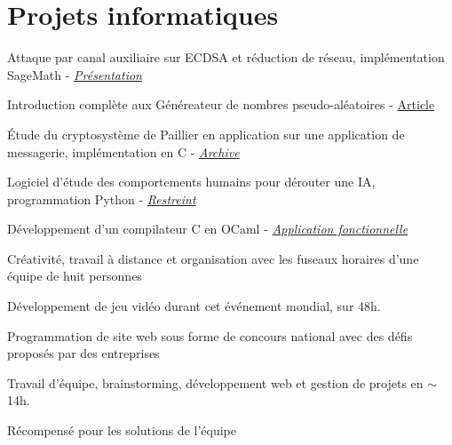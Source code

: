   \section{Projets informatiques}

  \begin{resume_list}
    \item Attaque par canal auxiliaire sur ECDSA et réduction de réseau, implémentation SageMath - \href{https://github.com/FloDarPie/side_channel_ECDSA/blob/main/report/ECDSA_presentation_finale.pdf}{\scriptsize\textit{Présentation}}
    \item Introduction complète aux Généreateur de nombres pseudo-aléatoires - \href{https://github.com/FloDarPie/PRNG/blob/main/PRNG.pdf}{\scriptsize Article}
    \item Étude du cryptosystème de Paillier en application sur une application de messagerie, implémentation en C - \href{https://github.com/FloDarPie/Protocole-interrogation-anonyme-de-BDD---Chiffrement-de-Paillier}{\scriptsize\textit{Archive}}
    \item Logiciel d'étude des comportements humains pour dérouter une IA, programmation Python - \href{}{\scriptsize\textit{Restreint}}
    \item Développement d'un compilateur C en OCaml - \href{https://github.com/Me-k-01/Compilateur-TypeDeDonnee}{\scriptsize\textit{Application fonctionnelle}}
  \end{resume_list}

  \begin{resume_list}
    \item Créativité, travail à distance et organisation avec les fuseaux horaires d'une équipe de huit personnes
    \item Développement de jeu vidéo durant cet événement mondial, sur 48h.
  \end{resume_list}  

  \begin{resume_list}
    \item Programmation de site web sous forme de concours national avec des défis proposés par des entreprises
    \item Travail d'équipe, brainstorming, développement web et gestion de projets en $\sim$14h.
    \item Récompensé pour les solutions de l'équipe
  \end{resume_list}